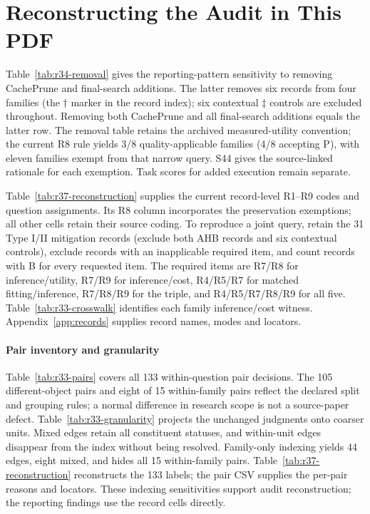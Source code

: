 \section{Reconstructing the Audit in This PDF}\label{app:reconstruction}
Table~\ref{tab:r34-removal} gives the reporting-pattern sensitivity to removing CachePrune and final-search additions. The latter removes six records from four families (the $\dagger$ marker in the record index); six contextual $\ddagger$ controls are excluded throughout. Removing both CachePrune and all final-search additions equals the latter row. The removal table retains the archived measured-utility convention; the current R8 rule yields 3/8 quality-applicable families (4/8 accepting P), with eleven families exempt from that narrow query. S44 gives the source-linked rationale for each exemption. Task scores for added execution remain separate.


Table~\ref{tab:r37-reconstruction} supplies the current record-level R1--R9 codes and question assignments. Its R8 column incorporates the preservation exemptions; all other cells retain their source coding. To reproduce a joint query, retain the 31 Type I/II mitigation records (exclude both AHB records and six contextual controls), exclude records with an inapplicable required item, and count records with B for every requested item. The required items are R7/R8 for inference/utility, R7/R9 for inference/cost, R4/R5/R7 for matched fitting/inference, R7/R8/R9 for the triple, and R4/R5/R7/R8/R9 for all five. Table~\ref{tab:r33-crosswalk} identifies each family inference/cost witness. Appendix~\ref{app:records} supplies record names, modes and locators.


\paragraph{Pair inventory and granularity}
Table~\ref{tab:r33-pairs} covers all 133 within-question pair decisions. The 105 different-object pairs and eight of 15 within-family pairs reflect the declared split and grouping rules; a normal difference in research scope is not a source-paper defect. Table~\ref{tab:r33-granularity} projects the unchanged judgments onto coarser units. Mixed edges retain all constituent statuses, and within-unit edges disappear from the index without being resolved. Family-only indexing yields 44 edges, eight mixed, and hides all 15 within-family pairs. Table~\ref{tab:r37-reconstruction} reconstructs the 133 labels; the pair CSV supplies the per-pair reasons and locators. These indexing sensitivities support audit reconstruction; the reporting findings use the record cells directly.

